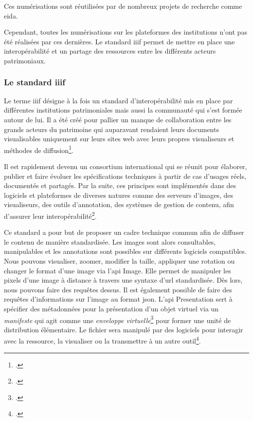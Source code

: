 Ces numérisations sont réutilisées par de nombreux projets de recherche comme \gls{eida}.

Cependant, toutes les numérisations sur les plateformes des institutions n'ont pas été réalisées par ces dernières. Le standard \gls{iiif} permet de mettre en place une interopérabilité et un partage des ressources entre les différents acteurs patrimoniaux. 

\subsubsection{Le standard \gls{iiif}} 

Le terme \gls{iiif} désigne à la fois un standard d'interopérabilité mis en place par différentes institutions patrimoniales mais aussi la communauté qui s'est formée autour de lui. Il a été créé pour pallier un manque de collaboration entre les grands acteurs du patrimoine qui auparavant rendaient leurs documents visualisables uniquement sur leurs sites web avec leurs propres visualiseurs et méthodes de diffusion\footcite{IIIFDocumentationBiblissima}.

Il est rapidement devenu un consortium international qui se réunit pour élaborer, publier et faire évoluer les spécifications techniques à partir de cas d'usages réels, documentés et partagés. Par la suite, ces principes sont implémentés dans des logiciels et plateformes de diverses natures comme des serveurs d'images, des visualiseurs, des outils d'annotation, des systèmes de gestion de contenu, afin d'assurer leur interopérabilité\footcite{charpierAtelierInitiationIIIF2024}.

Ce standard a pour but de proposer un cadre technique commun afin de diffuser le contenu de manière standardisée. Les images sont alors consultables, manipulables et les annotations sont possibles sur différents logiciels compatibles. Nous pouvons visualiser, zoomer, modifier la taille, appliquer une rotation ou changer le format d'une image via l'\gls{api} Image. Elle permet de manipuler les pixels d'une image à distance à travers une syntaxe d'\gls{url} standardisée. Dès lors, nous pouvons faire des requêtes dessus. Il est également possible de faire des requêtes d'informations sur l'image au format \gls{json}. L'\gls{api} Presentation sert à spécifier des métadonnées pour la présentation d'un objet virtuel via un \textit{manifeste} qui agit comme une \og \textit{enveloppe virtuelle}\footcite{IIIFDocumentationBiblissima} \fg pour former une unité de distribution élémentaire. Le fichier sera manipulé par des logiciels pour interagir avec la ressource, la visualiser ou la transmettre à un autre outil\footcite{IIIFDocumentationBiblissima}.

